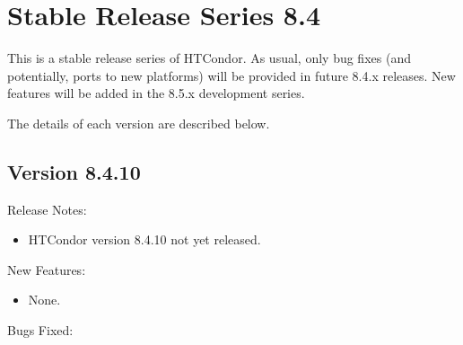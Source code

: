 
\section{\label{sec:History-8-4}Stable Release Series 8.4}

This is a stable release series of HTCondor.
As usual, only bug fixes (and potentially, ports to new platforms)
will be provided in future 8.4.x releases.
New features will be added in the 8.5.x development series.

The details of each version are described below.

\subsection*{\label{sec:New-8-4-10}Version 8.4.10}

\noindent Release Notes:

\begin{itemize}

\item HTCondor version 8.4.10 not yet released.

\end{itemize}


\noindent New Features:

\begin{itemize}

\item None.

\end{itemize}

\noindent Bugs Fixed:

